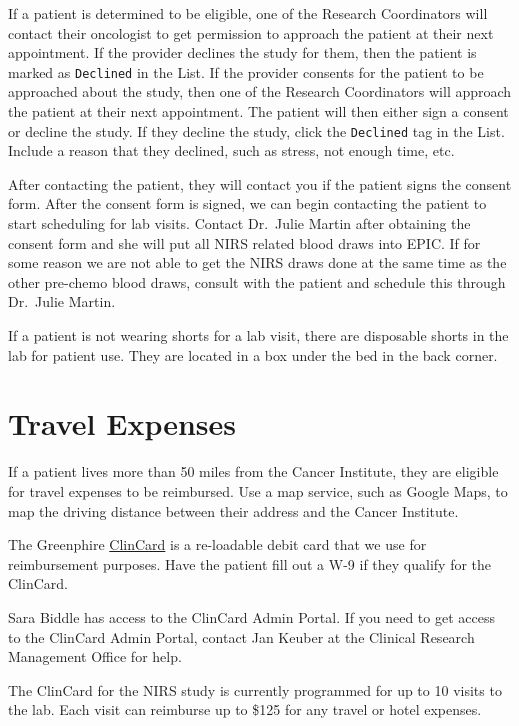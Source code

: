 \documentclass[
]{book}
\begin{document}
If a patient is determined to be eligible, one of the Research Coordinators will contact their oncologist to get permission to approach the patient at their next appointment. If the provider declines the study for them, then the patient is marked as \texttt{Declined} in the List. If the provider consents for the patient to be approached about the study, then one of the Research Coordinators will approach the patient at their next appointment. The patient will then either sign a consent or decline the study. If they decline the study, click the \texttt{Declined} tag in the List. Include a reason that they declined, such as stress, not enough time, etc.

After contacting the patient, they will contact you if the patient signs the consent form. After the consent form is signed, we can begin contacting the patient to start scheduling for lab visits. Contact Dr.~Julie Martin after obtaining the consent form and she will put all NIRS related blood draws into EPIC. If for some reason we are not able to get the NIRS draws done at the same time as the other pre-chemo blood draws, consult with the patient and schedule this through Dr.~Julie Martin.

If a patient is not wearing shorts for a lab visit, there are disposable shorts in the lab for patient use. They are located in a box under the bed in the back corner.

\hypertarget{travel-expenses}{%
\section{Travel Expenses}\label{travel-expenses}}

If a patient lives more than 50 miles from the Cancer Institute, they are eligible for travel expenses to be reimbursed. Use a map service, such as Google Maps, to map the driving distance between their address and the Cancer Institute.

The Greenphire \href{https://www.clincard.com}{ClinCard} is a re-loadable debit card that we use for reimbursement purposes. Have the patient fill out a W-9 if they qualify for the ClinCard.

Sara Biddle has access to the ClinCard Admin Portal. If you need to get access to the ClinCard Admin Portal, contact Jan Keuber at the Clinical Research Management Office for help.

The ClinCard for the NIRS study is currently programmed for up to 10 visits to the lab. Each visit can reimburse up to \$125 for any travel or hotel expenses.
\end{document}
